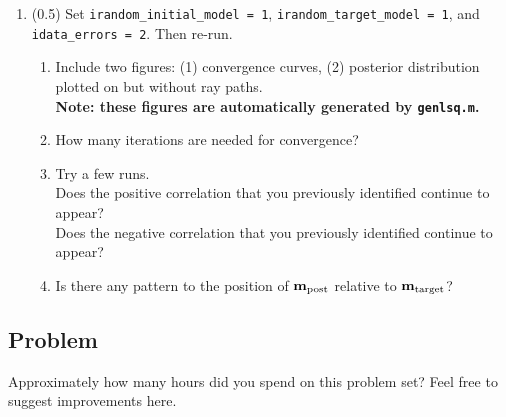 \documentclass[11pt,titlepage,fleqn]{article}
\begin{document}
\begin{enumerate}

\item (0.5) Set \verb+irandom_initial_model = 1+, \verb+irandom_target_model = 1+, and \verb+idata_errors = 2+. Then re-run.
%
\begin{enumerate}
\item Include two figures: (1) convergence curves, (2) posterior distribution plotted on  but without ray paths. \\
{\bf Note: these figures are automatically generated by \verb+genlsq.m+.}
\item How many iterations are needed for convergence?
\item Try a few runs. \\
Does the positive correlation that you previously identified continue to appear? \\
Does the negative correlation that you previously identified continue to appear?
\item Is there any pattern to the position of $\mbox{${\bf m}$}_{\rm post}$ relative to $\mbox{${\bf m}$}_{\rm target}$?
\end{enumerate}

\end{enumerate}


\subsection*{Problem}

Approximately how many hours did you spend on this problem set? Feel free to suggest improvements here.





\end{document}
